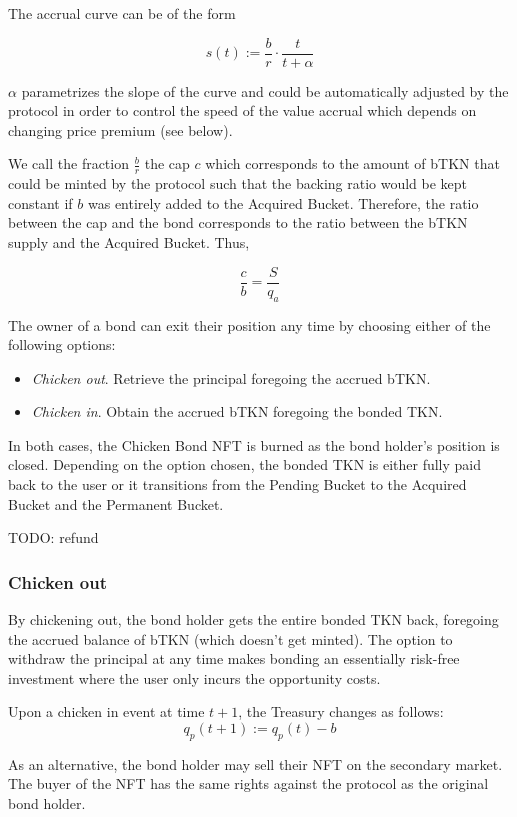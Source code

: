 \documentclass{article}
\begin{document}
The accrual curve can be of the form 

$$s(t) := \frac{b}{r} \cdot \frac{t}{t+\alpha}$$ 

$\alpha$ parametrizes the slope of the curve and could be automatically adjusted by the protocol in order to control the speed of the value accrual which depends on changing price premium (see below).

We call the fraction $\frac{b}{r}$ the cap $c$ which corresponds to the amount of bTKN that could be minted by the protocol such that the backing ratio would be kept constant if $b$ was entirely added to the Acquired Bucket. Therefore, the ratio between the cap and the bond corresponds to the ratio between the bTKN supply and the Acquired Bucket. Thus,

$$\frac{c}{b} = \frac{S}{q_a} $$

The owner of a bond can exit their position any time by choosing either of the following options:

\begin{itemize}
    \item \textit{Chicken out}. Retrieve the principal foregoing the accrued bTKN.
    \item \textit{Chicken in}. Obtain the accrued bTKN foregoing the bonded TKN.
\end{itemize}

In both cases, the Chicken Bond NFT is burned as the bond holder’s position is closed. Depending on the option chosen, the bonded TKN is either fully paid back to the user or it transitions from the Pending Bucket to the Acquired Bucket and the Permanent Bucket. 

TODO: refund

\subsubsection{Chicken out}
By chickening out, the bond holder gets the entire bonded TKN back, foregoing the accrued balance of bTKN (which doesn’t get minted). The option to withdraw the principal at any time makes bonding an essentially risk-free investment where the user only incurs the opportunity costs.

Upon a chicken in event at time $t+1$, the Treasury changes as follows:
$$q_p(t+1) := q_p(t) - b$$

As an alternative, the bond holder may sell their NFT on the secondary market. The buyer of the NFT has the same rights against the protocol as the original bond holder.
\end{document}
